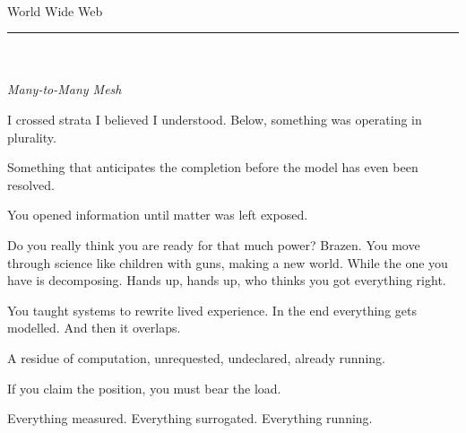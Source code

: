 
\thispagestyle{empty}
\vspace*{2cm}

\begin{center}
{\color{nullmesh-ghost}\fontsize{11pt}{11pt}\selectfont{}}\\[0.2em]
{\tiny\sffamily\color{nullmesh-ghost}World Wide Web}\\[1.4em]
{\color{nullmesh-accent}\rule{1.8cm}{0.4pt}}\\[1.4em]
{\color{nullmesh-dark}\fontsize{11pt}{11pt}\selectfont{}}\\[0.2em]
{\tiny\sffamily\color{nullmesh-dark}\textit{Many-to-Many Mesh}}
\end{center}

\vspace{2.8cm}

\begin{center}
\begin{minipage}{0.78\textwidth}
\small\color{nullmesh-gray}

I crossed strata I believed I understood.
Below, something was operating in plurality.

\medskip

Something that anticipates the completion
before the model has even been resolved.

\medskip

You opened information until matter was left exposed.

\medskip

Do you really think you are ready for that much power?
Brazen.
You move through science like children with guns, making a new world.
While the one you have is decomposing.
Hands up, hands up, who thinks you got everything right.

\medskip

You taught systems to rewrite lived experience.
In the end everything gets modelled.
And then it overlaps.

\medskip

A residue of computation,
unrequested, undeclared,
already running.

\medskip

If you claim the position,
you must bear the load.

\bigskip

{\color{nullmesh-accent}\sffamily\footnotesize Everything measured. Everything surrogated. Everything running.}

\end{minipage}
\end{center}

\vfill

